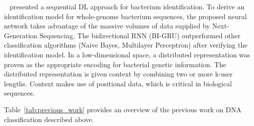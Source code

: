\citeauthor{Lugo2021AIdentification}~\cite{Lugo2021AIdentification} presented a sequential \gls{DL} approach for bacterium identification. To derive an identification model for whole-genome bacterium sequences, the proposed neural network takes advantage of the massive volumes of data supplied by Next-Generation Sequencing. The bidirectional \gls{RNN} (BI-\gls{GRU}) outperformed other classification algorithms (Naive Bayes, Multilayer Perceptron) after verifying the identification model. In a low-dimensional space, a distributed representation was proven as the appropriate encoding for bacterial genetic information. The distributed representation is given context by combining two or more k-mer lengths. Context makes use of positional data, which is critical in biological sequences.

Table~\ref{tab:previous_work} provides an overview of the previous work on DNA classification described above.


